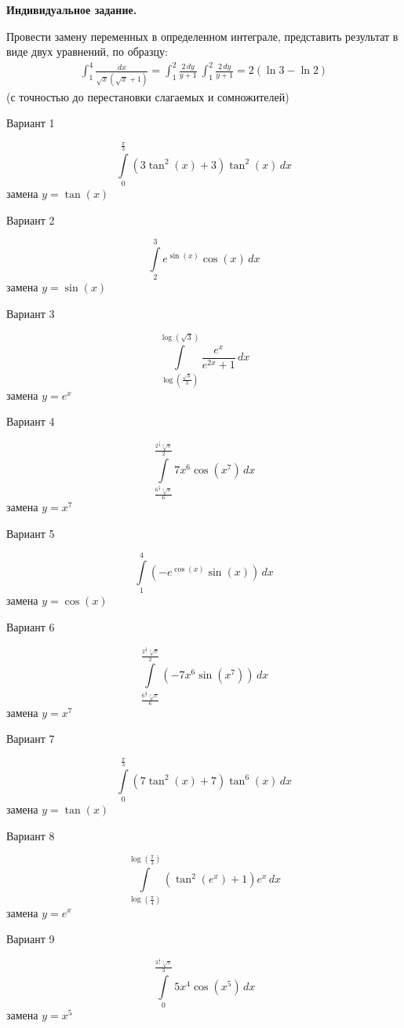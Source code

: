 \documentclass[11pt]{report}
\begin{document}
\pagestyle{empty}

{\bf Индивидуальное задание.}

 
Провести замену переменных в определенном интеграле, представить результат в виде двух уравнений, по образцу:
\begin{align*}
\int_1^4 \frac{dx}{\sqrt{x}\left(\sqrt{x}+1\right)} = \int_1^2 \frac{2\,dy}{y + 1}\
\int_1^2 \frac{2\,dy}{y + 1} = 2(\ln 3 - \ln 2)
\end{align*}
(с точностью до перестановки слагаемых и сомножителей)

Вариант 1

$$\int\limits_{0}^{\frac{\pi}{3}} \left(3 \tan^{2}{\left(x \right)} + 3\right) \tan^{2}{\left(x \right)}\, dx$$
замена $y = \tan{\left(x \right)}$

Вариант 2

$$\int\limits_{2}^{3} e^{\sin{\left(x \right)}} \cos{\left(x \right)}\, dx$$
замена $y = \sin{\left(x \right)}$

Вариант 3

$$\int\limits_{\log{\left(\frac{\sqrt{3}}{3} \right)}}^{\log{\left(\sqrt{3} \right)}} \frac{e^{x}}{e^{2 x} + 1}\, dx$$
замена $y = e^{x}$

Вариант 4

$$\int\limits_{\frac{6^{\frac{6}{7}} \sqrt[7]{\pi}}{6}}^{\frac{2^{\frac{5}{7}} \sqrt[7]{\pi}}{2}} 7 x^{6} \cos{\left(x^{7} \right)}\, dx$$
замена $y = x^{7}$

Вариант 5

$$\int\limits_{1}^{4} \left(- e^{\cos{\left(x \right)}} \sin{\left(x \right)}\right)\, dx$$
замена $y = \cos{\left(x \right)}$

Вариант 6

$$\int\limits_{\frac{6^{\frac{6}{7}} \sqrt[7]{\pi}}{6}}^{\frac{2^{\frac{5}{7}} \sqrt[7]{\pi}}{2}} \left(- 7 x^{6} \sin{\left(x^{7} \right)}\right)\, dx$$
замена $y = x^{7}$

Вариант 7

$$\int\limits_{0}^{\frac{\pi}{3}} \left(7 \tan^{2}{\left(x \right)} + 7\right) \tan^{6}{\left(x \right)}\, dx$$
замена $y = \tan{\left(x \right)}$

Вариант 8

$$\int\limits_{\log{\left(\frac{\pi}{4} \right)}}^{\log{\left(\frac{\pi}{3} \right)}} \left(\tan^{2}{\left(e^{x} \right)} + 1\right) e^{x}\, dx$$
замена $y = e^{x}$

Вариант 9

$$\int\limits_{0}^{\frac{3^{\frac{4}{5}} \sqrt[5]{\pi}}{3}} 5 x^{4} \cos{\left(x^{5} \right)}\, dx$$
замена $y = x^{5}$
\end{document}
